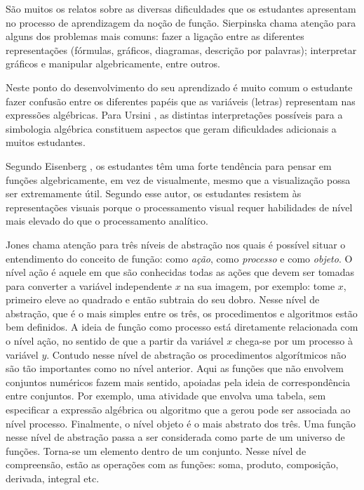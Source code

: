 \begin{apresentacao}
São muitos os relatos sobre as  diversas dificuldades que os estudantes apresentam no processo de aprendizagem da noção de função. Sierpinska \cite{Sierpinska-1992} chama atenção para alguns dos problemas mais comuns:  fazer a ligação entre as diferentes representações (fórmulas, gráficos, diagramas, descrição por palavras); interpretar gráficos e manipular algebricamente, entre outros.

Neste ponto do desenvolvimento do seu aprendizado é muito comum o estudante fazer confusão entre os diferentes papéis que as variáveis (letras) representam nas expressões algébricas. Para Ursini \cite{Ursini-et-al-2001}, as distintas interpretações possíveis para a simbologia algébrica constituem aspectos que geram dificuldades adicionais a muitos estudantes.

Segundo Eisenberg \cite{Eisenberg-1992}, os estudantes têm uma forte tendência para pensar em funções algebricamente, em vez de visualmente, mesmo que a visualização possa ser extremamente útil. Segundo esse autor, os estudantes resistem às representações visuais porque o processamento visual requer habilidades de nível mais elevado do que o processamento analítico.

Jones \cite{Jones-2006} chama atenção para três níveis de abstração nos quais é possível situar o entendimento do conceito de função:  como \textit{ação}, como \textit{processo} e como \textit{objeto}. O nível ação é aquele em que são conhecidas todas as ações que devem ser tomadas para converter a variável independente \(x\) na sua imagem, por exemplo: tome \(x\), primeiro eleve ao quadrado e então subtraia do seu dobro. Nesse nível de abstração, que é o mais simples entre os três, os procedimentos e algoritmos estão bem definidos. A ideia de função como processo está diretamente relacionada com o nível ação, no sentido de que a partir da variável \(x\) chega-se por um processo à variável \(y\). Contudo nesse nível de abstração os procedimentos algorítmicos não são tão importantes como no nível anterior. Aqui as funções que não envolvem conjuntos numéricos fazem mais sentido, apoiadas pela ideia de correspondência entre conjuntos. Por exemplo, uma atividade que envolva uma tabela, sem especificar a expressão algébrica ou algoritmo que a gerou pode ser associada ao nível processo. Finalmente, o nível objeto é o mais abstrato dos três. Uma função nesse nível de abstração passa a ser considerada como parte de um universo de funções. Torna-se um elemento dentro de um conjunto. Nesse nível de compreensão, estão as operações com as funções: soma, produto, composição, derivada, integral etc.


\end{apresentacao}
